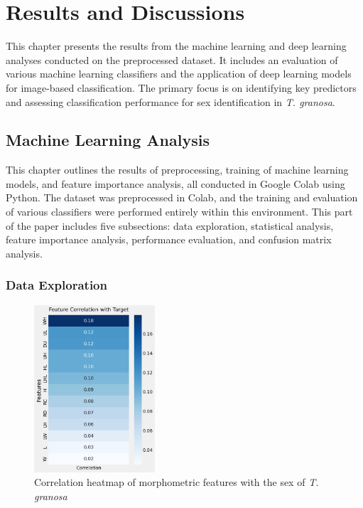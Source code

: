 
\chapter{Results and Discussions}
This chapter presents the results from the machine learning and deep learning analyses conducted on the preprocessed dataset. It includes an evaluation of various machine learning classifiers and the application of deep learning models for image-based classification. The primary focus is on identifying key predictors and assessing classification performance for sex identification in \textit{T. granosa}.

\section{Machine Learning Analysis}

This chapter outlines the results of preprocessing, training of machine learning models, and feature importance analysis, all conducted in Google Colab using Python. The dataset was preprocessed in Colab, and the training and evaluation of various classifiers were performed entirely within this environment.  This part of the paper includes five subsections: data exploration, statistical analysis, feature importance analysis, performance evaluation, and confusion matrix analysis.

\subsection{Data Exploration}

\begin{figure}[!htbp]
	\centering
	\includegraphics[width=0.4\textwidth]{figures/heatmap.png}
	\caption{Correlation heatmap of morphometric features with the sex of \textit{T. granosa}}
	\label{fig:heatmap}
\end{figure}

